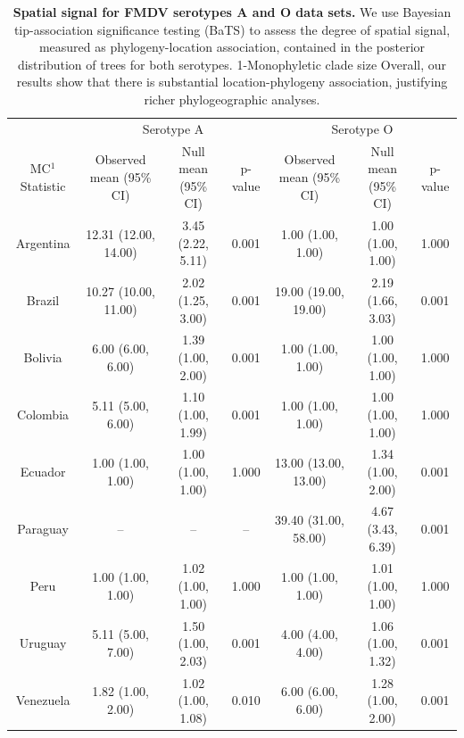 \documentclass[a4paper,10pt]{article}
\begin{document}
\begin{table}
\caption{
\textbf{Spatial signal for FMDV serotypes A and O data sets.} 
We use Bayesian tip-association significance testing (BaTS) to assess the degree of spatial signal, measured as phylogeny-location association, contained in the posterior distribution of trees for both serotypes. 1-Monophyletic clade size
Overall, our results show that there is substantial location-phylogeny association, justifying richer phylogeographic analyses.}
\begin{tabular}{ccccccc}
\toprule
&\multicolumn{3}{c}{Serotype A} & \multicolumn{3}{c}{Serotype O} \\
MC$^1$ Statistic &Observed mean (95\% CI)&Null mean (95\% CI)&p-value &Observed mean (95\% CI)&Null mean (95\% CI)&p-value\\
\midrule
Argentina &12.31 (12.00, 14.00)	&3.45	(2.22, 5.11)	&0.001& 1.00 (1.00, 1.00)&	1.00 (1.00, 1.00)&	1.000\\
Brazil &10.27	(10.00, 11.00)	&2.02 (1.25, 3.00) &0.001& 19.00 (19.00, 19.00)&	2.19 (1.66, 3.03)&	0.001\\
Bolivia &6.00 (6.00, 6.00)	&1.39 (1.00, 2.00)	&0.001&1.00 (1.00, 1.00)&	1.00 (1.00, 1.00)&	1.000\\
Colombia &5.11 (5.00, 6.00)	&1.10  (1.00, 1.99)	&0.001&1.00 (1.00, 1.00)&	1.00 (1.00, 1.00)&	1.000\\
Ecuador &1.00 (1.00, 1.00)	&1.00 (1.00, 1.00)	&1.000&13.00 (13.00, 13.00)&	1.34 (1.00, 2.00)&	0.001\\
Paraguay&-- &-- &--  & 39.40 (31.00, 58.00)& 4.67 (3.43, 6.39)&0.001\\
Peru&1.00 (1.00, 1.00)	&1.02 (1.00, 1.00)&1.000&1.00 (1.00, 1.00)&1.01 (1.00, 1.00)&1.000\\
Uruguay &5.11 (5.00, 7.00)	&1.50	(1.00, 2.03)	&0.001&4.00 (4.00, 4.00)&	1.06 (1.00, 1.32)&	0.001\\
Venezuela&1.82 (1.00, 2.00)	&1.02 (1.00, 1.08)	&0.010&6.00 (6.00, 6.00)&	1.28 (1.00, 2.00)&	0.001\\
\bottomrule
\end{tabular}
\begin{flushleft}
\end{flushleft}
\label{stab:BaTS}
\end{table}
\end{document}
